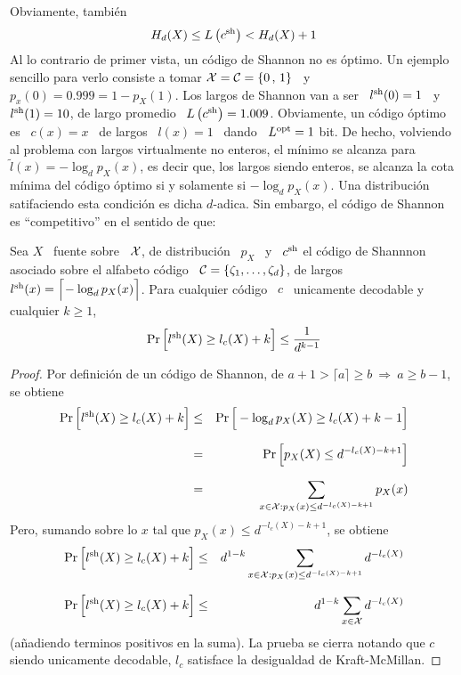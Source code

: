 %
Obviamente, tambi\'en
%
\[
H_d(X) \le L\left( c^{\mathrm{sh}}  \right) < H_d(X) +  1
\]
%
Al lo  contrario de  primer vista, un  c\'odigo de  Shannon no es  \'optimo.  Un
ejemplo sencillo para verlo consiste a tomar $\mathcal{X} = \mathcal{C} = \{ 0 \, , \, 1 \}$ \ y \
$p_x(0) = 0.999 = 1 - p_X(1)$.  Los largos de Shannon van a ser \ $l^{\mathrm{sh}}(0) = 1$
\ y  \ $l^{\mathrm{sh}}(1) =  10$, de  largo promedio \  $L\left( c^{\mathrm{sh}} \right)  = 1.009$.
Obviamente, un  c\'odigo \'optimo es  \ $c(x) =  x$ \ de largos  \ $l(x) =  1$ \
dando  \  $L^{\mathrm{opt}}  =  1$  bit.   De hecho,  volviendo  al  problema  con  largos
virtualmente  no enteros,  el m\'inimo  se  alcanza para  $\widetilde{l}(x) =  -
\log_d p_X(x)$,  es decir  que, los  largos siendo enteros,  se alcanza  la cota
m\'inima  del  c\'odigo \'optimo  si  y solamente  si  $-  \log_d p_X(x)$.   Una
distribuci\'on satifaciendo  esta condici\'on es dicha  $d$-adica.  Sin embargo,
el c\'odigo de Shannon es ``competitivo'' en el sentido de que:
%
\begin{teorema}
  Sea $X$  \ fuente sobre  \ $\mathcal{X}$, de  distribuci\'on \ $p_X$  \ y \  $c^{\mathrm{sh}}$ el
  c\'odigo de Shannnon asociado sobre el  alfabeto c\'odigo \ $\mathcal{C} = \{ \zeta_1 ,
  \ldots  , \zeta_d \}$,  de largos  $l^{\mathrm{sh}}(x) =  \Big\lceil\!  -  \log_d p_X(x)
  \Big\rceil$.  Para cualquier c\'odigo \ $c$ \ unicamente decodable y cualquier
  $k \ge 1$,
  \[
  \Pr\Big[ l^{\mathrm{sh}}(X) \ge l_c(X) + k \Big] \le \frac{1}{d^{k-1}}
  \]
\end{teorema}
%
\begin{proof}
  Por definici\'on de un c\'odigo de Shannon, de  $a + 1 > \lceil a \rceil \ge b
  \: \Rightarrow \: a \ge b-1$, se obtiene
  \begin{eqnarray*}
    \Pr\Big[ l^{\mathrm{sh}}(X)  \ge l_c(X) + k  \Big] & \le & \Pr\Big[  - \log_d p_X(X)
    \ge  l_c(X) + k  - 1  \Big]\\[2.5mm]
    & = &  \Pr\Big[ p_X(X)  \le d^{-l_c(X)  - k  + 1} \Big]\\[2.5mm]
    & = &  \sum_{x \in \mathcal{X} : p_X(x) \le d^{-l_c(X)  - k  + 1}} p_X(x)
  \end{eqnarray*}
  Pero,  sumando sobre  lo $x$  tal que  $p_X(x) \le  d^{-l_c(X) -  k +  1}$, se
  obtiene
  \begin{eqnarray*}
  \Pr\Big[ l^{\mathrm{sh}}(X) \ge l_c(X) + k \Big] & \le & d^{1-k} \sum_{x \in \mathcal{X} :
  p_X(x) \le d^{-l_c(X) - k + 1}} d^{-l_c(X)}\\[2.5mm]
  \Pr\Big[ l^{\mathrm{sh}}(X) \ge l_c(X) + k \Big] & \le & d^{1-k} \sum_{x \in \mathcal{X}}
  d^{-l_c(X)}
  \end{eqnarray*}
  (a\~nadiendo terminos positivos  en la suma). La prueba  se cierra notando que
  $c$   siendo  unicamente   decodable,  $l_c$   satisface  la   desigualdad  de
  Kraft-McMillan.
\end{proof}
